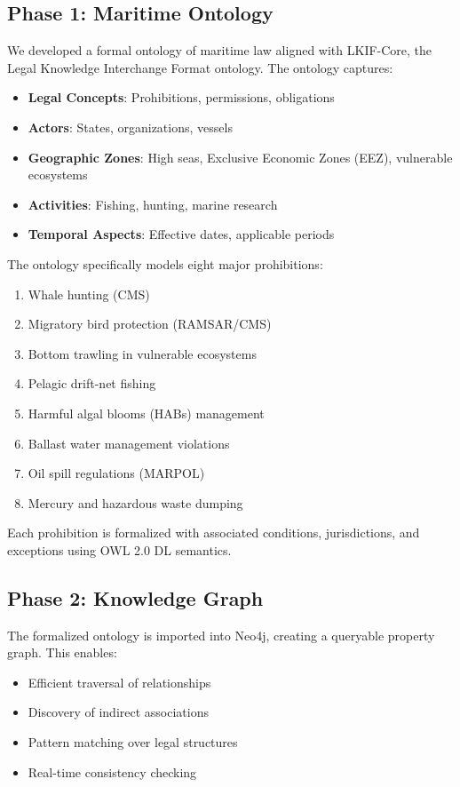 \documentclass[11pt,a4paper]{article}
\begin{document}
\subsection{Phase 1: Maritime Ontology}

We developed a formal ontology of maritime law aligned with LKIF-Core, the Legal Knowledge Interchange Format ontology. The ontology captures:

\begin{itemize}
\item \textbf{Legal Concepts}: Prohibitions, permissions, obligations
\item \textbf{Actors}: States, organizations, vessels
\item \textbf{Geographic Zones}: High seas, Exclusive Economic Zones (EEZ), vulnerable ecosystems
\item \textbf{Activities}: Fishing, hunting, marine research
\item \textbf{Temporal Aspects}: Effective dates, applicable periods
\end{itemize}

The ontology specifically models eight major prohibitions:
\begin{enumerate}
\item Whale hunting (CMS)
\item Migratory bird protection (RAMSAR/CMS)
\item Bottom trawling in vulnerable ecosystems
\item Pelagic drift-net fishing
\item Harmful algal blooms (HABs) management
\item Ballast water management violations
\item Oil spill regulations (MARPOL)
\item Mercury and hazardous waste dumping
\end{enumerate}

Each prohibition is formalized with associated conditions, jurisdictions, and exceptions using OWL 2.0 DL semantics.

\subsection{Phase 2: Knowledge Graph}

The formalized ontology is imported into Neo4j, creating a queryable property graph. This enables:
\begin{itemize}
\item Efficient traversal of relationships
\item Discovery of indirect associations
\item Pattern matching over legal structures
\item Real-time consistency checking
\end{itemize}
\end{document}
